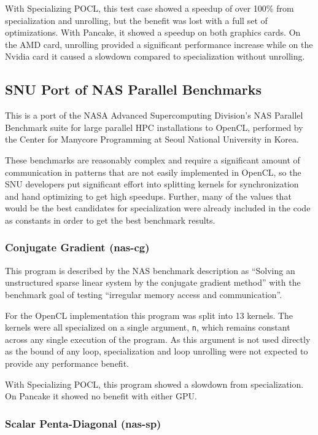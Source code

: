 \documentclass{acm_proc_article-sp}
\begin{document}
With Specializing POCL, this test case showed a speedup of over 100\% from
specialization and unrolling, but the benefit was lost with a full set of
optimizations. With Pancake, it showed a speedup on both graphics cards. On the
AMD card, unrolling provided a significant performance increase while on the
Nvidia card it caused a slowdown compared to specialization without unrolling.

\subsection{SNU Port of NAS Parallel Benchmarks}

This is a port of the NASA Advanced Supercomputing Division's NAS Parallel
Benchmark\cite{Van:2002:NAS} suite for large parallel HPC installations to
OpenCL, performed by the Center for Manycore Programming at Seoul National
University in Korea\cite{Seo:2011:NASPerf}.

These benchmarks are reasonably complex and require a significant amount of
communication in patterns that are not easily implemented in OpenCL, so the SNU
developers put significant effort into splitting kernels for synchronization
and hand optimizing to get high speedups. Further, many of the values that
would be the best candidates for specialization were already included in the
code as constants in order to get the best benchmark results. 

\subsubsection{Conjugate Gradient (nas-cg)}

This program is described by the NAS benchmark description as ``Solving an
unstructured sparse linear system by the conjugate gradient method'' with the
benchmark goal of testing ``irregular memory access and communication''.

For the OpenCL implementation this program was split into 13 kernels. The
kernels were all specialized on a single argument, {\tt n}, which remains
constant across any single execution of the program. As this argument is not
used directly as the bound of any loop, specialization and loop unrolling were
not expected to provide any performance benefit.

With Specializing POCL, this program showed a slowdown from specialization. On
Pancake it showed no benefit with either GPU.

\subsubsection{Scalar Penta-Diagonal (nas-sp)}
\end{document}
